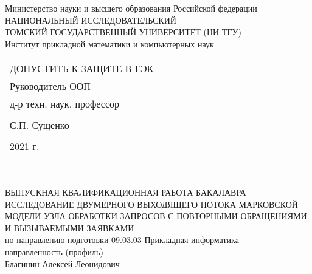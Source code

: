 	\begin{center}\linespread{1}
		\normalsize{Министерство науки и высшего образования Российской федерации}\\
		\normalsize{НАЦИОНАЛЬНЫЙ ИССЛЕДОВАТЕЛЬСКИЙ}\\ 
		\normalsize{ТОМСКИЙ ГОСУДАРСТВЕННЫЙ УНИВЕРСИТЕТ (НИ ТГУ)}\\
		\normalsize{Институт прикладной математики и компьютерных наук}\\
		\hfill\break
		
	\end{center}
\begin{flushright}\linespread{0.9}
	\normalsize{ 
		\begin{tabular}{@{}l@{}}
			ДОПУСТИТЬ К ЗАЩИТЕ В ГЭК\\ 
			Руководитель ООП\\  д-р техн. наук,  профессор\\\\ \underline{\hspace{3.5cm}} С.П. Сущенко\\\\
			\textquote{\underline{\hspace{1cm}}}\underline{\hspace{4cm}}2021 г.	
		\end{tabular}	
	}\\
\end{flushright}
\hfill \break
\hfill \break
\begin{center}\linespread{1}
		\large{ВЫПУСКНАЯ КВАЛИФИКАЦИОННАЯ РАБОТА БАКАЛАВРА}\\
		\hfill \break
		\large{ИССЛЕДОВАНИЕ ДВУМЕРНОГО ВЫХОДЯЩЕГО ПОТОКА МАРКОВСКОЙ МОДЕЛИ УЗЛА ОБРАБОТКИ ЗАПРОСОВ С ПОВТОРНЫМИ ОБРАЩЕНИЯМИ И ВЫЗЫВАЕМЫМИ ЗАЯВКАМИ}\\
		\hfill \break
		\normalsize{по направлению подготовки 09.03.03 Прикладная информатика\\
		направленность (профиль)  \\
		\hfill \break
	Благинин Алексей Леонидович}\\
		\hfill \break
		\hfill \break
	\end{center}
